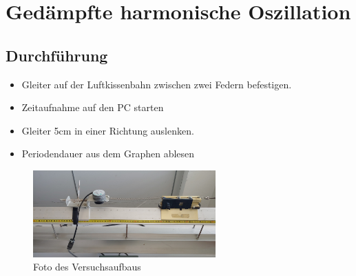 \documentclass{article}
\begin{document}
    \section{Gedämpfte harmonische Oszillation}
      \subsection{Durchführung}
          \begin{itemize}
              \item Gleiter auf der Luftkissenbahn zwischen zwei Federn befestigen.
              \item Zeitaufnahme auf den PC starten
              \item Gleiter 5cm in einer Richtung auslenken.
              \item Periodendauer aus dem Graphen ablesen
          \end{itemize}
          \begin{figure}[!ht]\label{fig:foto_harmonisch}
              \centering
              \includegraphics[width=7cm]{fotos/harmonisch.jpg}
              \caption{Foto des Versuchsaufbaus}
          \end{figure}
\end{document}
